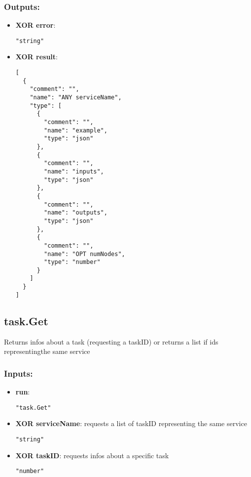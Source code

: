 \subsubsection*{Outputs:}
\begin{itemize}
    \item \textbf{XOR error}: 
\begin{lstlisting}
"string"
\end{lstlisting}
    \item \textbf{XOR result}: 
\begin{lstlisting}
[
  {
    "comment": "", 
    "name": "ANY serviceName", 
    "type": [
      {
        "comment": "", 
        "name": "example", 
        "type": "json"
      }, 
      {
        "comment": "", 
        "name": "inputs", 
        "type": "json"
      }, 
      {
        "comment": "", 
        "name": "outputs", 
        "type": "json"
      }, 
      {
        "comment": "", 
        "name": "OPT numNodes", 
        "type": "number"
      }
    ]
  }
]
\end{lstlisting}
  \end{itemize}

\subsection{task.Get}
Returns infos about a task (requesting a taskID) or returns a list if ids representingthe same service
\subsubsection*{Inputs:}
\begin{itemize}
    \item \textbf{run}: 
\begin{lstlisting}
"task.Get"
\end{lstlisting}
    \item \textbf{XOR serviceName}: requests a list of taskID representing the same service
\begin{lstlisting}
"string"
\end{lstlisting}
    \item \textbf{XOR taskID}: requests infos about a specific task
\begin{lstlisting}
"number"
\end{lstlisting}
  \end{itemize}

